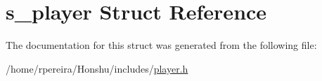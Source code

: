 \hypertarget{structs__player}{}\section{s\+\_\+player Struct Reference}
\label{structs__player}


The documentation for this struct was generated from the following file\+:\begin{DoxyCompactItemize}
\item 
/home/rpereira/\+Honshu/includes/\hyperlink{player_8h}{player.\+h}\end{DoxyCompactItemize}
